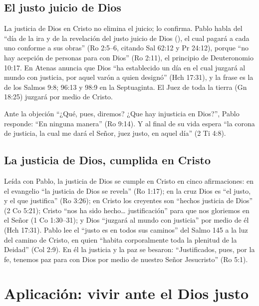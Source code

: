 \subsection{El justo juicio de Dios}
La justicia de Dios en Cristo no elimina el juicio; lo confirma. Pablo habla del ``día de la ira y de la revelación del justo juicio de Dios (), el cual pagará a cada uno conforme a sus obras'' (Ro 2:5--6, citando Sal 62:12 y Pr 24:12), porque ``no hay acepción de personas para con Dios'' (Ro 2:11), el principio de Deuteronomio 10:17. En Atenas anuncia que Dios ``ha establecido un día en el cual juzgará al mundo con justicia, por aquel varón a quien designó'' (Hch 17:31), y la frase  es la de los Salmos 9:8; 96:13 y 98:9 en la Septuaginta. El Juez de toda la tierra (Gn 18:25) juzgará por medio de Cristo.

Ante la objeción ``¿Qué, pues, diremos? ¿Que hay injusticia en Dios?'', Pablo responde: ``En ninguna manera'' (Ro 9:14). Y al final de su vida espera ``la corona de justicia, la cual me dará el Señor, juez justo, en aquel día'' (2 Ti 4:8).


\subsection{La justicia de Dios, cumplida en Cristo}
Leída con Pablo, la justicia de Dios se cumple en Cristo en cinco afirmaciones: en el evangelio ``la justicia de Dios se revela'' (Ro 1:17); en la cruz Dios es ``el justo, y el que justifica'' (Ro 3:26); en Cristo los creyentes son ``hechos justicia de Dios'' (2 Co 5:21); Cristo ``nos ha sido hecho\ldots{} justificación'' para que nos gloriemos en el Señor (1 Co 1:30--31); y Dios ``juzgará al mundo con justicia'' por medio de él (Hch 17:31). Pablo lee el ``justo es \SENOR{} en todos sus caminos'' del Salmo 145 a la luz del camino de Cristo, en quien ``habita corporalmente toda la plenitud de la Deidad'' (Col 2:9). En él la justicia y la paz se besaron: ``Justificados, pues, por la fe, tenemos paz para con Dios por medio de nuestro Señor Jesucristo'' (Ro 5:1).

\section{Aplicación: vivir ante el Dios justo}

